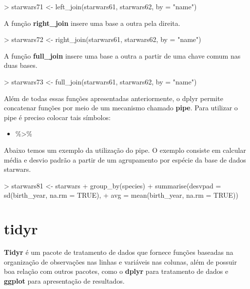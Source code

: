 \documentclass[12pt,a4paper,oneside]{erdc}
\begin{document}
\begin{Schunk}
\begin{Sinput}
> starwars71 <- left_join(starwars61, starwars62, by = "name")
\end{Sinput}
\end{Schunk}

A função \textbf{right\_join} insere uma base a outra pela direita.

\begin{Schunk}
\begin{Sinput}
> starwars72 <- right_join(starwars61, starwars62, by = "name")
\end{Sinput}
\end{Schunk}

A função \textbf{full\_join} insere uma base a outra a partir de uma chave comum nas duas bases.

\begin{Schunk}
\begin{Sinput}
> starwars73 <- full_join(starwars61, starwars62, by = "name")
\end{Sinput}
\end{Schunk}

Além de todas essas funções apresentadas anteriormente, o dplyr permite concatenar funções por meio de um mecanismo chamado \textbf{pipe}. Para utilizar o pipe é preciso colocar tais símbolos: 

\begin{itemize}
	\item \%>\%
\end{itemize}

Abaixo temos um exemplo da utilização do pipe. O exemplo consiste em calcular média e desvio padrão a partir de um agrupamento por espécie da base de dados starwars.

\begin{Schunk}
\begin{Sinput}
> starwars81 <- starwars %
+   group_by(species) %
+   summarise(desvpad = sd(birth_year, na.rm = TRUE),
+             avg = mean(birth_year, na.rm = TRUE))
\end{Sinput}
\end{Schunk}

\section{tidyr}

\textbf{Tidyr} é um pacote de tratamento de dados que fornece funções baseadas na organização de observações nas linhas e variáveis nas colunas, além de possuir boa relação com outros pacotes, como o \textbf{dplyr} para tratamento de dados e \textbf{ggplot} para apresentação de resultados.
	
\end{document}

